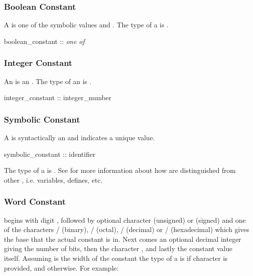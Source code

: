 \subsubsection{Boolean Constant}
\label{Boolean Constant}

A  is one of the symbolic
values  and .
%
The type of a  is \Boolean.

\begin{Grammar}
boolean_constant :: \emph{one of}
         
\end{Grammar}

\subsubsection{Integer Constant}
\label{Integer Constant}

An  is an . The type
of an  is \Integer.

\begin{Grammar}
integer_constant :: integer_number
\end{Grammar}

\subsubsection{Symbolic Constant}
\label{Symbolic Constant}

A  is syntactically an 
and indicates a unique value.

\begin{Grammar}
symbolic_constant :: identifier
\end{Grammar}

\noindent The type of a  is \SymbEnum. 
%
See  for more information about how
 are distinguished from other
, i.e. variables, defines, etc.

\subsubsection{Word Constant}
\label{Word Constant}

 begins with digit , 
followed by optional character  (unsigned) or 
(signed) and one of the characters / (binary),
/ (octal), / (decimal) or 
/ (hexadecimal) which 
gives the base that the actual constant is in. 
%
Next comes an optional decimal integer giving the number of bits, 
then the character \code{\_}, and lastly the constant value itself.
%
Assuming  is the width of the constant the type of a
 is \SWord[N] if character  is
provided, and \UWord[N] otherwise.  For example:

